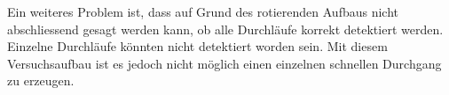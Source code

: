 Ein weiteres Problem ist, dass auf Grund des rotierenden Aufbaus nicht abschliessend gesagt werden kann, ob alle Durchläufe korrekt detektiert werden. Einzelne Durchläufe könnten nicht detektiert worden sein. Mit diesem Versuchsaufbau ist es jedoch nicht möglich einen einzelnen schnellen Durchgang zu erzeugen.

